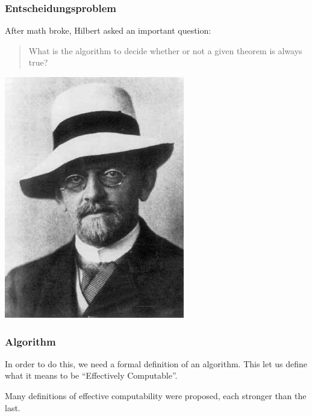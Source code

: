 \documentclass[mathserif]{beamer}
\begin{document}
\begin{frame}
  \frametitle{Entscheidungsproblem}

  \begin{multicols}{2}
    After math broke, Hilbert asked an important question:

    \begin{quote}
      What is the algorithm to decide whether or not a given theorem is always
      true?
    \end{quote}

    \includegraphics[width=\linewidth]{media/hilbert.jpg}
  \end{multicols}
\end{frame}

\begin{frame}
  \frametitle{Algorithm}
  In order to do this, we need a formal definition of an algorithm. This let
  us define what it means to be ``Effectively Computable''.

  Many definitions of effective computability were proposed, each stronger than
  the last.
\end{frame}
\end{document}
